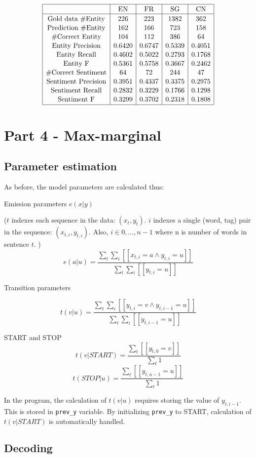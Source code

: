 \documentclass[12pt]{article}
\begin{document}
\[
\begin{array}{|c|c|c|c|c|}
\hline \rule{0pt}{1em}
& \mbox{EN} & \mbox{FR} & \mbox{SG} & \mbox{CN} \\
\hline \rule{0pt}{1em}
\mbox{Gold data \#Entity}  & 226    & 223    & 1382   & 362   \\[0.1em]
\mbox{Prediction \#Entity} & 162   & 166  & 723   & 158  \\[0.1em]
\mbox{\#Correct Entity}    & 104    & 112    & 386    & 64   \\[0.1em]
\mbox{Entity Precision}   & 0.6420 & 0.6747 & 0.5339 & 0.4051 \\[0.1em]
\mbox{Entity Recall}      & 0.4602 & 0.5022 & 0.2793 & 0.1768 \\[0.1em]
\mbox{Entity F}           & 0.5361 & 0.5758 & 0.3667 & 0.2462 \\[0.1em]
\mbox{\#Correct Sentiment} & 64     & 72     & 244    & 47    \\[0.1em]
\mbox{Sentiment Precision}& 0.3951 & 0.4337 & 0.3375 & 0.2975 \\[0.1em]
\mbox{Sentiment Recall}   & 0.2832 & 0.3229 & 0.1766 & 0.1298 \\[0.1em]
\mbox{Sentiment F}        & 0.3299 & 0.3702 & 0.2318 & 0.1808 \\[0.1em] 
\hline
\end{array}
\]

\pagebreak

\section{Part 4 - Max-marginal}

\subsection{Parameter estimation}

As before, the model parameters are calculated thus:

Emission parameters \(e(x|y)\)

(\(t\) indexes each sequence in the data: \((x_t, y_t)\). \(i\) indexes a single (word, tag) pair in the sequence: \((x_{t,i}, y_{t,i})\). Also, \(i \in {0,...,n-1}\) where n is number of words in sentence \(t\). )
\[ e(a|u) = \frac{\sum_t \sum_i [[x_{t,i}=a \land y_{t,i}=u]] }{\sum_{t} \sum_i [[y_{t,i}=u]] } \]

Transition parameters

\[ t(v|u) = \frac{\sum_t \sum_i [[y_{t,i}=v \land y_{t,i-1}=u]] }{\sum_{t} \sum_i [[y_{t,i-1}=u]] } \]

START and STOP
\[ t(v|START) = \frac{\sum_t [[y_{t,0}=v]] }{\sum_{t} 1 } \]
\[ t(STOP|u) = \frac{\sum_t [[y_{t,n-1}=u]] }{\sum_{t} 1 } \]

In the program, the calculation of \(t(v|u)\) requires storing the value of \(y_{t,i-1}\). This is stored in \verb|prev_y| variable. By initializing \verb|prev_y| to START, calculation of \(t(v|START)\) is automatically handled.

\subsection{Decoding}
\end{document}
